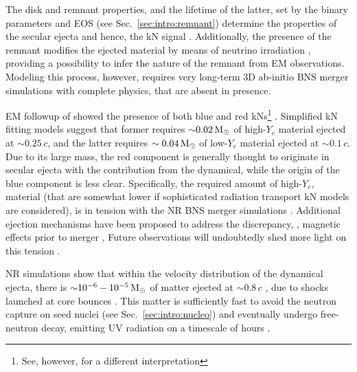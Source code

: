 The \pmerg{} disk and remnant properties, and the lifetime of the latter, set by the 
binary parameters and \ac{EOS} (see Sec.~\ref{sec:intro:remnant}) \citep{Radice:2018xqa,Perego:2019adq} 
determine the properties of the secular ejecta and hence, the \ac{kN} signal 
\citep[\eg][]{Radice:2018pdn}.
Additionally, the presence of the remnant modifies the ejected material by means of 
neutrino irradiation \citep{Fernandez:2015use}, providing a possibility to infer the nature of 
the remnant from \ac{EM} observations. Modeling this process, however, requires very long-term 
$3$D ab-initio \ac{BNS} merger simulations with complete physics, that are absent in presence.

\ac{EM} followup of \GW{} showed the presence of both blue and red \acp{kN}\footnote{
    See, however, \citet{Waxman:2017sqv} for a different interpretation
} \citep{Villar:2017wcc}.
Simplified \ac{kN} fitting models suggest that former requires ${\sim}0.02\,{\text{M}_{\odot}}$ of high-$Y_e$ 
material ejected at ${\sim0.25}\,c$, and the latter requires ${\sim0.04\,{\text{M}_{\odot}}}$ of low-$Y_e$ 
material ejected at ${\sim0.1}\,c$. Due to its large mass, the red component is 
generally thought to originate in secular ejecta with the contribution from the dynamical, while 
the origin of the blue component is less clear. Specifically, the required amount of high-$Y_e$,
material (that are somewhat lower if sophisticated radiation transport \ac{kN} models are considered),
is in tension with the \ac{NR} \ac{BNS} merger simulations 
\citep{Sekiguchi:2016bjd,Siegel:2019mlp,Perego:2017wtu,Kawaguchi:2018ptg}.
Additional ejection mechanisms have been proposed to address the discrepancy, \eg, 
magnetic effects prior to merger \citep{Metzger:2018qfl,Fernandez:2018kax,Radice:2018ghv}, 
Future observations will undoubtedly shed more light on this tension \citep{Metzger:2018qfl}.

\ac{NR} simulations show that within the velocity distribution of the dynamical ejecta, 
there is ${\sim}10^{-6}-10^{-5}\,{\text{M}_{\odot}}$ of matter ejected at ${\sim}0.8\,c$ 
\citep{Metzger:2014yda,Hotokezaka:2018gmo,Radice:2018pdn,Radice:2018ghv}, due to shocks launched 
at core bounces \citep{Radice:2018pdn}.
This matter is sufficiently fast to avoid the neutron capture on seed nuclei 
(see Sec.~\ref{sec:intro:nucleo}) and eventually undergo free-neutron decay, emitting 
\ac{UV} radiation on a timescale of hours \citep{Metzger:2014yda}. 

